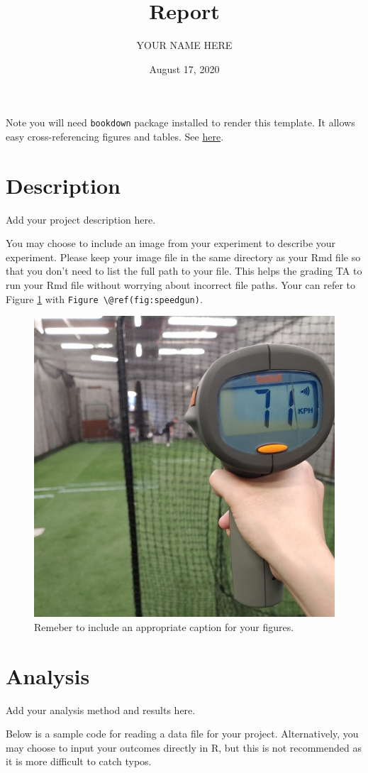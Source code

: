 \documentclass[
]{article}
\title{Report}
\author{YOUR NAME HERE}
\date{August 17, 2020}
\begin{document}
\maketitle

Note you will need \texttt{bookdown} package installed to render this template. It allows easy cross-referencing figures and tables. See \href{https://bookdown.org/yihui/rmarkdown-cookbook/cross-ref.html}{here}.

\hypertarget{description}{%
\section{Description}\label{description}}

Add your project description here.

You may choose to include an image from your experiment to describe your experiment. Please keep your image file in the same directory as your Rmd file so that you don't need to list the full path to your file. This helps the grading TA to run your Rmd file without worrying about incorrect file paths. Your can refer to Figure \ref{fig:speedgun} with \texttt{Figure\ \textbackslash{}@ref(fig:speedgun)}.

\begin{figure}

{\centering \includegraphics[width=.3\linewidth]{measure} 

}

\caption{Remeber to include an appropriate caption for your figures.}\label{fig:speedgun}
\end{figure}

\hypertarget{analysis}{%
\section{Analysis}\label{analysis}}

Add your analysis method and results here.

Below is a sample code for reading a data file for your project. Alternatively, you may choose to input your outcomes directly in R, but this is not recommended as it is more difficult to catch typos.
\end{document}
